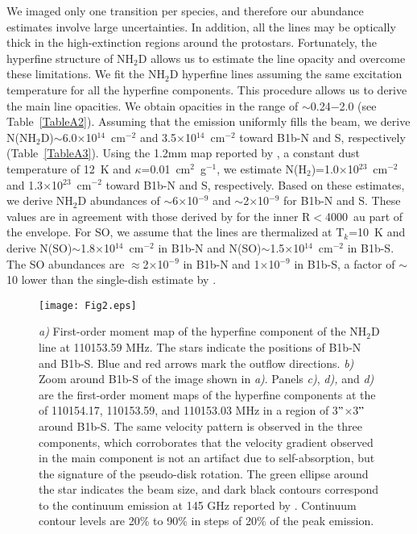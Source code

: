 \documentclass[letter]{aa}
\begin{document}
We imaged only one transition per species, and therefore our abundance estimates involve large uncertainties. 
In addition, all the lines may be optically thick in the high-extinction regions around the protostars.
Fortunately, the hyperfine structure of NH$_2$D allows us to estimate the line opacity and 
overcome these limitations.
We fit the NH$_2$D  hyperfine lines assuming the same excitation temperature 
for all the hyperfine components. This procedure allows us to derive
the main line opacities. We obtain opacities in the range of  $\sim$0.24$-$2.0 (see Table~\ref{TableA2}).  
Assuming that the emission uniformly fills the beam, we derive
N(NH$_2$D)$\sim$6.0$\times$10$^{14}$~cm$^{-2}$ and 3.5$\times$10$^{14}$~cm$^{-2}$ toward B1b-N and S,
respectively (Table~\ref{TableA3}).  Using the 1.2mm map reported by \citet{Daniel13}, a constant dust temperature of 12~K and
$\kappa$=0.01~cm$^2$~g$^{-1}$, we estimate N(H$_2$)=1.0$\times$10$^{23}$~cm$^{-2}$ and 1.3$\times$10$^{23}$~cm$^{-2}$
toward B1b-N and S, respectively. Based on these estimates, we derive 
NH$_2$D abundances of  $\sim$6$\times$10$^{-9}$  and $\sim$2$\times$10$^{-9}$  
for B1b-N and S. These values are in agreement with those derived by \citet{Daniel13} for the inner
R$<$4000~au part of the envelope. For SO, we assume that the lines are thermalized at T$_{k}$=10~K and derive 
N(SO)$\sim$1.8$\times$10$^{14}$~cm$^{-2}$ in B1b-N and N(SO)$\sim$1.5$\times$10$^{14}$~cm$^{-2}$ in
B1b-S. The SO abundances 
are $\approx$2$\times$10$^{-9}$ in B1b-N and 1$\times$10$^{-9}$ in B1b-S, a factor of $\sim$10 lower 
than the single-dish estimate by \citet{Fuente16}.

  \begin{figure*}
 \texttt{[image: Fig2.eps]}
     \caption{{\em a)} First-order moment map of the hyperfine component of the NH$_2$D line at 110153.59 MHz.
     The stars indicate the positions of B1b-N and B1b-S. Blue and red arrows mark the outflow directions. 
     {\em b)} Zoom around B1b-S of the image shown in {\em a)}. Panels {\em c)}, {\em d),} and {\em d)}
    are the first-order moment maps of the hyperfine components at the of 110154.17, 110153.59, and 110153.03 MHz in 
    a region of 3$"$$\times$3$"$ around B1b-S. The same velocity pattern is observed in the three components, which 
    corroborates
    that the velocity gradient observed in the main component is not an artifact due to self-absorption, but the
    signature of the pseudo-disk rotation. The green ellipse around the star indicates the beam size, and 
    dark black contours correspond to the continuum emission at 145 GHz reported
    by \citet{Gerin15}. Continuum contour levels are 20\% to 90\% in steps of 20\% of the peak emission.}
         \label{Fig2}
   \end{figure*}
\end{document}
